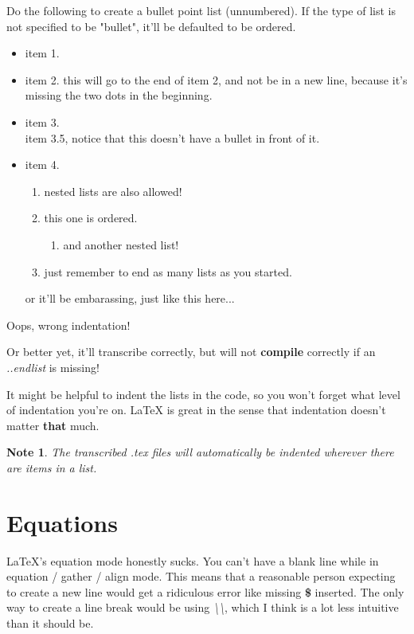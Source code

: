 \documentclass[12pt]{article}
\newtheorem{Note}[Lemma]{Note}
\begin{document}
\begin{flushleft}
Do the following to create a bullet point list (unnumbered).
If the type of list is not specified to be "bullet", it'll be defaulted to be
ordered.
\begin{itemize}
    \item item 1.
    \item item 2.
    this will go to the end of item 2, and not be in a new line, because it's missing the two dots in the beginning.
    \item item 3.
    \\ item 3.5, notice that this doesn't have a bullet in front of it.
    \item item 4.
    \begin{enumerate}
        \item nested lists are also allowed!
        \item this one is ordered.
        \begin{enumerate}
            \item and another nested list!
        \end{enumerate}
        \item just remember to end as many lists as you started.
    \end{enumerate}
    
    or it'll be embarassing, just like this here...
    
\end{itemize}

Oops, wrong indentation!

Or better yet, it'll transcribe correctly,
but will not \textbf{compile} correctly if an \emph{..endlist} is missing!

It might be helpful to indent the lists in the code, so you won't forget what level of indentation you're on. LaTeX is great in the sense that indentation doesn't matter \textbf{that} much.

\begin{Note}
The transcribed .tex files will automatically be indented wherever there are items in a list.
\end{Note}

\section{Equations}

LaTeX's equation mode honestly sucks. You can't have a blank line while in equation / gather / align mode. This means that a reasonable person expecting to create a new line would get a ridiculous error like missing \textbf{\$} inserted. The only way to create a line break would be using \emph{\textbackslash\textbackslash}, which I think is a lot less intuitive than it should be.


\end{flushleft}
\end{document}
